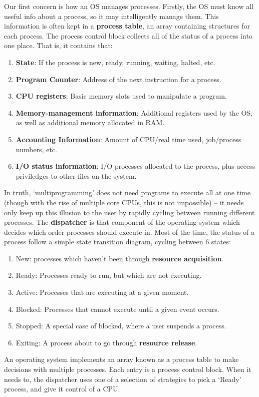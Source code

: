 Our first concern is how an OS manages processes. Firstly, the OS must know all useful info about a process, so it may intelligently manage them. This information is often kept in a {\bf process table}, an array containing structures for each process. The process control block collects all of the status of a process into one place. That is, it contains that:
%
\begin{enumerate}
    \item {\bf State}: If the process is new, ready, running, waiting, halted, etc.
    \item {\bf Program Counter}: Address of the next instruction for a process.
    \item {\bf CPU registers}: Basic memory slots used to manipulate a program.
    \item {\bf Memory-management information}: Additional registers used by the OS, as well as additional memory allocated in RAM.
    \item {\bf Accounting Information}: Amount of CPU/real time used, job/process numbers, etc.
    \item {\bf I/O status information}: I/O processes allocated to the process, plus access priviledges to other files on the system.
\end{enumerate}

In truth, `multiprogramming' does not need programs to execute all at one time (though with the rise of multiple core CPUs, this is not impossible) -- it needs only keep up this illusion to the user by rapidly cycling between running different processes. The {\bf dispatcher} is that component of the operating system which decides which order processes should execute in. Most of the time, the status of a process follow a simple state transition diagram, cycling between 6 states:
%
\begin{enumerate}
    \item New: processes which haven't been through {\bf resource acquisition}.
    \item Ready: Processes ready to run, but which are not executing.
    \item Active: Processes that are executing at a given moment.
    \item Blocked: Processes that cannot execute until a given event occurs.
    \item Stopped: A special case of blocked, where a user suspends a process.
    \item Exiting: A process about to go through {\bf resource release}.
\end{enumerate}
%
An operating system implements an array known as a process table to make decisions with multiple processes. Each entry is a process control block. When it needs to, the dispatcher uses one of a selection of strategies to pick a `Ready' process, and give it control of a CPU.

